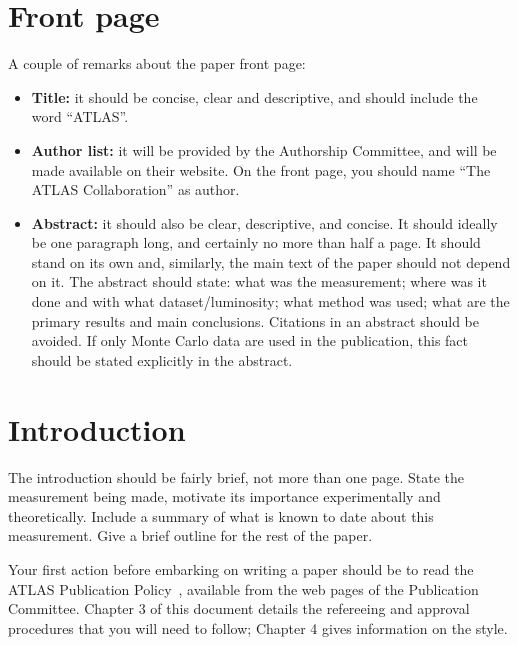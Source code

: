 \documentclass[coverpage]{style/atlasdoc}
\begin{document}
\tableofcontents
\clearpage

\section{Front page}
\label{sec:front}

A couple of remarks about the paper front page:
\begin{itemize}

\item {\bf Title:} it should be concise, clear and descriptive, and
  should include the word ``ATLAS''.

\item {\bf Author list:} it will be provided by the Authorship
  Committee, and will be made available on their website. On the
  front page, you should name ``The ATLAS Collaboration'' as
  author.

\item {\bf Abstract:} it should also be clear, descriptive, and
  concise. It should ideally be one paragraph long, and certainly no
  more than half a page. It should stand on its own and, similarly,
  the main text of the paper should not depend on it. The abstract
  should state: what was the measurement; where was it done and with
  what dataset/luminosity; what method was used; what are the
  primary results and main conclusions.  Citations in an abstract
  should be avoided. If only Monte Carlo data are used in the
  publication, this fact should be stated explicitly in the
  abstract.  
  
\end{itemize}


\section{Introduction}
\label{sec:intro}

The introduction should be fairly brief, not more than one page.
State the measurement being made, motivate its importance
experimentally and theoretically. Include a summary of what is known
to date about this measurement. Give a brief outline for the rest of
the paper.

Your first action before embarking on writing a paper should be to
read the ATLAS Publication Policy~\cite{publication-policy}, available
from the web pages of the Publication Committee. Chapter 3 of this
document details the refereeing and approval procedures that you will
need to follow; Chapter 4 gives information on the style.
\end{document}
